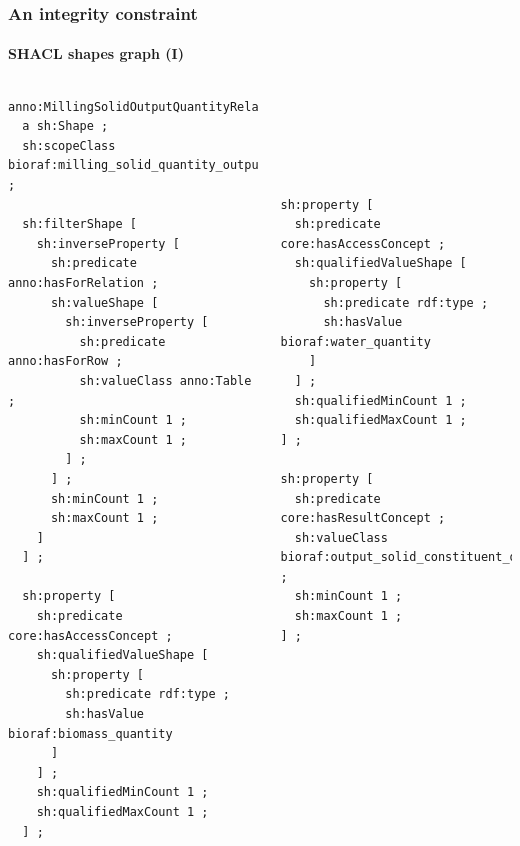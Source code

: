 \documentclass{beamer}
\begin{document}
\begin{frame}[fragile]
  \frametitle{An integrity constraint}
  \framesubtitle{SHACL shapes graph (I)}

  \begin{columns}[t]

    \begin{Verbatim}[fontsize=\tiny]
anno:MillingSolidOutputQuantityRelationshipShape
  a sh:Shape ;
  sh:scopeClass bioraf:milling_solid_quantity_output_relation ;

  sh:filterShape [
    sh:inverseProperty [
      sh:predicate anno:hasForRelation ;
      sh:valueShape [
        sh:inverseProperty [
          sh:predicate anno:hasForRow ;
          sh:valueClass anno:Table ;
          sh:minCount 1 ;
          sh:maxCount 1 ;
        ] ;
      ] ;
      sh:minCount 1 ;
      sh:maxCount 1 ;
    ]
  ] ;

  sh:property [
    sh:predicate core:hasAccessConcept ;
    sh:qualifiedValueShape [
      sh:property [
        sh:predicate rdf:type ;
        sh:hasValue bioraf:biomass_quantity
      ]
    ] ;
    sh:qualifiedMinCount 1 ;
    sh:qualifiedMaxCount 1 ;
  ] ;
    \end{Verbatim}


    \begin{Verbatim}[fontsize=\tiny]





sh:property [
  sh:predicate core:hasAccessConcept ;
  sh:qualifiedValueShape [
    sh:property [
      sh:predicate rdf:type ;
      sh:hasValue bioraf:water_quantity
    ]
  ] ;
  sh:qualifiedMinCount 1 ;
  sh:qualifiedMaxCount 1 ;
] ;

sh:property [
  sh:predicate core:hasResultConcept ;
  sh:valueClass bioraf:output_solid_constituent_quantity ;
  sh:minCount 1 ;
  sh:maxCount 1 ;
] ;
    \end{Verbatim}
  \end{columns}
\end{frame}
\end{document}
